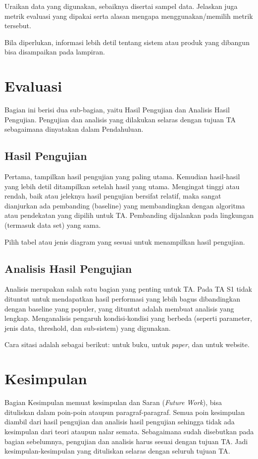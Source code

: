 Uraikan data yang digunakan, sebaiknya disertai sampel data. Jelaskan juga metrik evaluasi yang dipakai serta alasan mengapa menggunakan/memilih metrik tersebut.

Bila diperlukan, informasi lebih detil tentang sistem atau produk yang dibangun bisa disampaikan pada lampiran. 

\section{Evaluasi}

Bagian ini berisi dua sub-bagian, yaitu Hasil Pengujian dan Analisis Hasil Pengujian. Pengujian dan analisis yang dilakukan selaras dengan tujuan TA sebagaimana dinyatakan dalam Pendahuluan.

\subsection{Hasil Pengujian}

Pertama, tampilkan hasil pengujian yang paling utama. Kemudian hasil-hasil yang lebih detil ditampilkan setelah hasil yang utama. Mengingat tinggi atau rendah, baik atau jeleknya hasil pengujian bersifat relatif, maka sangat dianjurkan ada pembanding (baseline) yang membandingkan dengan algoritma atau pendekatan yang dipilih untuk TA. Pembanding dijalankan pada lingkungan (termasuk data set) yang sama.

Pilih tabel atau jenis diagram yang sesuai untuk menampilkan hasil pengujian. 


\subsection{Analisis Hasil Pengujian}
 Analisis merupakan salah satu bagian yang penting untuk TA. Pada TA S1 tidak dituntut untuk mendapatkan hasil performasi yang lebih bagus dibandingkan dengan baseline yang populer, yang dituntut adalah membuat analisis yang lengkap. Menganalisis pengaruh kondisi-kondisi yang berbeda (seperti parameter, jenis data, threshold, dan sub-sistem) yang digunakan. 
 
 Cara sitasi adalah sebagai berikut: \citep{van2002fundamentals} untuk buku, \citep{ochoa2003hybrid} untuk \textit{paper}, dan \citep{Budi} untuk website.
   
   
\section{Kesimpulan}
 \noindent Bagian Kesimpulan memuat kesimpulan dan Saran (\textit{Future Work}), bisa dituliskan dalam poin-poin ataupun paragraf-paragraf. Semua poin kesimpulan diambil dari hasil pengujian dan analisis hasil pengujian sehingga tidak ada kesimpulan dari teori ataupun nalar semata. Sebagaimana sudah disebutkan pada bagian sebelumnya, pengujian dan analisis harus sesuai dengan tujuan TA. Jadi kesimpulan-kesimpulan yang dituliskan selaras dengan seluruh tujuan TA. 
 



